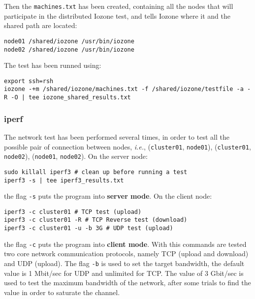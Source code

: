 Then the \texttt{machines.txt} has been created, containing all the nodes that will participate in the distributed Iozone test, and tells Iozone where it and the shared path are located:

\begin{verbatim}
node01 /shared/iozone /usr/bin/iozone 
node02 /shared/iozone /usr/bin/iozone
\end{verbatim}

The test has been runned using:

\begin{verbatim}
export ssh=rsh
iozone -+m /shared/iozone/machines.txt -f /shared/iozone/testfile -a -R -O | tee iozone_shared_results.txt
\end{verbatim}

\subsubsection{iperf}

The network test has been performed several times, in order to test all the possible pair of connection between nodes, \textit{i.e.}, (\texttt{cluster01}, \texttt{node01}), (\texttt{cluster01}, \texttt{node02}), (\texttt{node01}, \texttt{node02}).
On the server node:

\begin{verbatim}
sudo killall iperf3 # clean up before running a test
iperf3 -s | tee iperf3_results.txt
\end{verbatim}
the flag \texttt{-s} puts the program into \textbf{server mode}. On the client node:

\begin{verbatim}
iperf3 -c cluster01 # TCP test (upload)
iperf3 -c cluster01 -R # TCP Reverse test (download)
iperf3 -c cluster01 -u -b 3G # UDP test (upload)
\end{verbatim}

the flag \texttt{-c} puts the program into \textbf{client mode}. With this commands are tested two core network communication protocols, namely TCP (upload and download) and UDP (upload). The flag \texttt{-b} is used to set the target bandwidth, the default value is 1 Mbit/sec for UDP and unlimited for TCP. The value of 3 Gbit/sec is used to test the maximum bandwidth of the network, after some trials to find the value in order to saturate the channel.